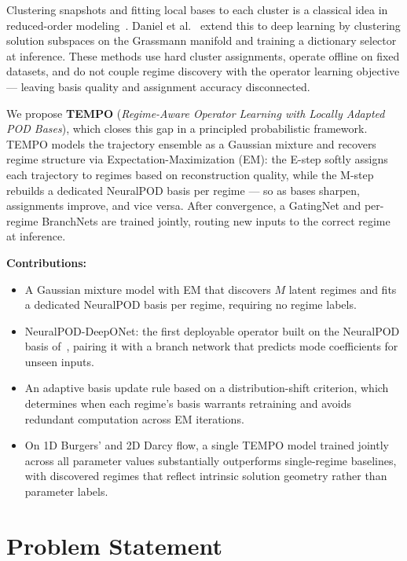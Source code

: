 \documentclass{article}
\begin{document}
Clustering snapshots and fitting local bases to each cluster is a classical
idea in reduced-order modeling~\cite{Amsallem2012, Hess2019}.
Daniel et al.~\cite{Daniel2020} extend this to deep learning by clustering
solution subspaces on the Grassmann manifold and training a dictionary
selector at inference.
These methods use hard cluster assignments, operate offline on fixed datasets,
and do not couple regime discovery with the operator learning objective —
leaving basis quality and assignment accuracy disconnected.

We propose \textbf{TEMPO} (\textit{Regime-Aware Operator Learning with
Locally Adapted POD Bases}), which closes this gap in a principled
probabilistic framework.
TEMPO models the trajectory ensemble as a Gaussian mixture and recovers regime
structure via Expectation-Maximization (EM): the E-step softly assigns each
trajectory to regimes based on reconstruction quality, while the M-step
rebuilds a dedicated NeuralPOD basis per regime — so as bases sharpen,
assignments improve, and vice versa.
After convergence, a GatingNet and per-regime BranchNets are trained jointly,
routing new inputs to the correct regime at inference.

\textbf{Contributions:}
\begin{itemize}[leftmargin=1.5em]
  \item A Gaussian mixture model with EM that discovers $M$ latent regimes
    and fits a dedicated NeuralPOD basis per regime, requiring no regime labels.
  \item NeuralPOD-DeepONet: the first deployable operator built on the
    NeuralPOD basis of~\cite{Mou2026}, pairing it with a branch network that
    predicts mode coefficients for unseen inputs.
  \item An adaptive basis update rule based on a distribution-shift criterion,
    which determines when each regime's basis warrants retraining and avoids
    redundant computation across EM iterations.
  \item On 1D Burgers' and 2D Darcy flow, a single TEMPO model trained jointly
    across all parameter values substantially outperforms single-regime
    baselines, with discovered regimes that reflect intrinsic solution geometry
    rather than parameter labels.
\end{itemize}


\section{Problem Statement}\label{sec:problem}
\end{document}
